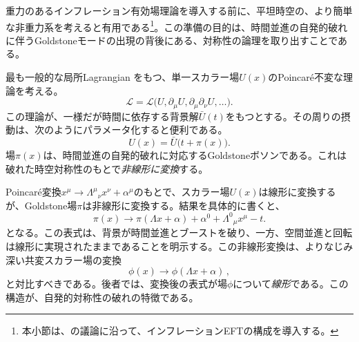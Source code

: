 \documentclass[a4paper,11pt,oneside]{article}
\theoremstyle{definition}
\numberwithin{equation}{section}
\begin{document}
重力のあるインフレーション有効場理論を導入する前に、平坦時空の、より簡単な非重力系を考えると有用である\footnote{本小節は、\cite{Finelli:2018upr}の議論に沿って、インフレーションEFT\cite{Creminelli:2006xe,Cheung:2007st}の構成を導入する。}。この準備の目的は、時間並進の自発的破れに伴うGoldstoneモードの出現の背後にある、対称性の論理を取り出すことである。



最も一般的な局所Lagrangian
をもつ、単一スカラー場\(U(x)\)のPoincar\'e不変な理論を考える。
\begin{equation}
\mathcal L=\mathcal L\bigl(U,\partial_\mu U,\partial_\mu\partial_\nu U,\dots\bigr) .
\end{equation}
この理論が、一様だが時間に依存する背景解\(\bar U(t)\)をもつとする。その周りの摂動は、次のようにパラメータ化すると便利である。
\begin{equation}
U(x)=\bar U\bigl(t+\pi(x)\bigr).
\end{equation}
場\(\pi(x)\)は、時間並進の自発的破れに対応するGoldstoneボソンである。これは破れた時空対称性のもとで\textit{非線形に変換}する。



Poincar\'e変換\(x^\mu\to \Lambda^\mu{}_\nu x^\nu+\alpha^\mu\)のもとで、スカラー場\(U(x)\)は線形に変換するが、Goldstone場\(\pi\)は非線形に変換する。結果を具体的に書くと、
\begin{equation}\label{Poincareonpi}
\pi(x)\to \pi(\Lambda x+\alpha)+\alpha^0+\Lambda^0{}_\mu x^\mu-t .
\end{equation}
となる。この表式は、背景が時間並進とブーストを破り、一方、空間並進と回転は線形に実現されたままであることを明示する。この非線形変換は、よりなじみ深い共変スカラー場の変換
\[ \phi(x) \to \phi(\Lambda x +\alpha) \,, \]
と対比すべきである。後者では、変換後の表式が場$  \phi $について\textit{線形}である。この構造が、自発的対称性の破れの特徴である。
\end{document}

